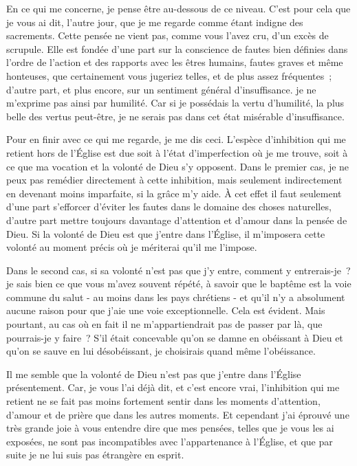 \documentclass[french,twoside]{book} %
\begin{document}
En ce qui me concerne, je pense être au-dessous de ce niveau. C'est pour cela que je vous ai dit, l'autre jour, que je me regarde comme étant indigne des sacrements. Cette pensée ne vient pas, comme vous l'avez cru, d'un excès de scrupule. Elle est fondée d'une part sur la conscience de fautes bien définies dans l'ordre de l'action et des rapports avec les êtres humains, fautes graves et même honteuses, que certainement vous jugeriez telles, et de plus assez fréquentes ; d'autre part, et plus encore, sur un sentiment général d'insuffisance. je ne m'exprime pas ainsi par humilité. Car si je possédais la vertu d'humilité, la plus belle des vertus peut-être, je ne serais pas dans cet état misérable d'insuffisance.\par
Pour en finir avec ce qui me regarde, je me dis ceci. L'espèce d'inhibition qui me retient hors de l'Église est due soit à l'état d'imperfection où je me trouve, soit à ce que ma vocation et la volonté de Dieu s'y opposent. Dans le premier cas, je ne peux pas remédier directement à cette inhibition, mais seulement indirectement en devenant moins imparfaite, si la grâce m'y aide. À cet effet il faut seulement d'une part s'efforcer d'éviter les fautes dans le domaine des choses naturelles, d'autre part mettre toujours davantage d'attention et d'amour dans la pensée de Dieu. Si la volonté de Dieu est que j'entre dans l'Église, il m'imposera cette volonté au moment précis où je mériterai qu'il me l'impose.\par
Dans le second cas, si sa volonté n'est pas que j'y entre, comment y entrerais-je ? je sais bien ce que vous m'avez souvent répété, à savoir que le baptême est la voie commune du salut - au moins dans les pays chrétiens - et qu'il n'y a absolument aucune raison pour que j'aie une voie exceptionnelle. Cela est évident. Mais pourtant, au cas où en fait il ne m'appartiendrait pas de passer par là, que pourrais-je y faire ? S'il était concevable qu'on se damne en obéissant à Dieu et qu'on se sauve en lui désobéissant, je choisirais quand même l'obéissance.\par
Il me semble que la volonté de Dieu n'est pas que j'entre dans l'Église présentement. Car, je vous l'ai déjà dit, et c'est encore vrai, l'inhibition qui me retient ne se fait pas moins fortement sentir dans les moments d'attention, d'amour et de prière que dans les autres moments. Et cependant j'ai éprouvé une très grande joie à vous entendre dire que mes pensées, telles que je vous les ai exposées, ne sont pas incompatibles avec l'appartenance à l'Église, et que par suite je ne lui suis pas étrangère en esprit.\par
\end{document}
